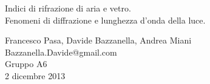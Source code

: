 \begin{center}

     	{\huge Indici di rifrazione di aria e vetro.\\}
     	\vspace{0.2cm}
     	{\huge Fenomeni di diffrazione e lunghezza d'onda della luce.}
	\vspace{0.3cm}

      	{\large Francesco Pasa, Davide Bazzanella, Andrea Miani} \\
      	{Bazzanella.Davide@gmail.com} \\
		{\large Gruppo A6} \\
	
	\vspace{0.1cm}
      	{\large 2 dicembre 2013}

\end{center}
